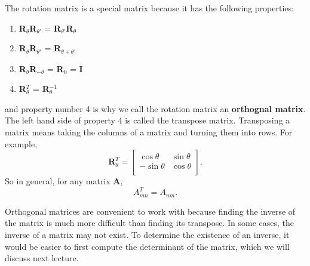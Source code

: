 \documentclass{article}
\begin{document}
The rotation matrix is a special matrix because it has the following properties:
\begin{enumerate}
  \item \textbf{R}$_{\theta}$\textbf{R}$_{\theta'}$ = \textbf{R}$_{\theta'}$\textbf{R}$_{\theta}$
  \item \textbf{R}$_{\theta}$\textbf{R}$_{\theta'}$ = \textbf{R}$_{\theta + \theta'}$
  \item \textbf{R}$_{\theta}$\textbf{R}$_{-\theta}$ = \textbf{R}$_{0}$ = \textbf{I}
  \item \textbf{R}$_{\theta}^T$ = \textbf{R}$_{\theta}^{-1}$
\end{enumerate}
and property number 4 is why we call the rotation matrix an \textbf{orthognal matrix}.
The left hand side of property 4 is called the transpose matrix.
Transposing a matrix means taking the columns of a matrix and turning them into rows.
For example,
\begin{equation}
  \textbf{R}_{\theta}^{T} =
  \begin{bmatrix}
    \cos{\theta} & \sin{\theta}\\
    -\sin{\theta} & \cos{\theta} \\
  \end{bmatrix}.
\end{equation}
So in general, for any matrix \textbf{A},
\begin{equation}
  A_{mn}^T = A_{nm} .
\end{equation}

Orthogonal matrices are convenient to work with because finding the inverse of the matrix is much more difficult than finding its transpose.
In some cases, the inverse of a matrix may not exist.
To determine the existence of an inverse, it would be easier to first compute the determinant of the matrix, which we will discuss next lecture.
\end{document}

